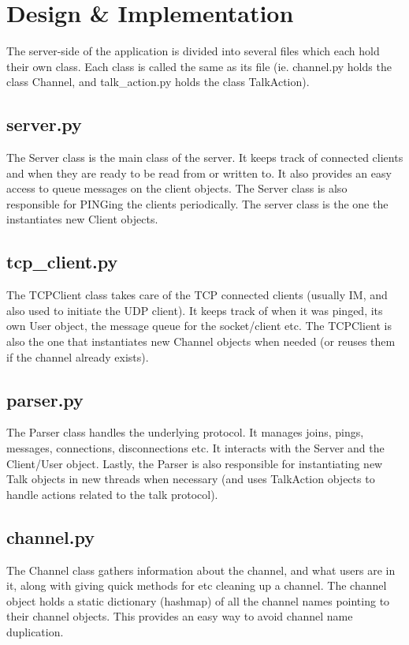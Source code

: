 \documentclass[12pt]{rapport}
\begin{document}
\section*{Design \& Implementation}
The server-side of the application is divided into several files which
each hold their own class. Each class is called the same as its file
(ie. channel.py holds the class Channel, and talk\_action.py holds the
class TalkAction).

\subsection*{server.py}
The Server class is the main class of the server. It keeps track of
connected clients and when they are ready to be read from or written
to. It also provides an easy access to queue messages on the client
objects. The Server class is also responsible for PINGing the clients
periodically. The server class is the one the instantiates new Client
objects.

\subsection*{tcp\_client.py}
The TCPClient class takes care of the TCP connected clients (usually
IM, and also used to initiate the UDP client). It keeps track of when
it was pinged, its own User object, the message queue for the
socket/client etc. The TCPClient is also the one that instantiates new
Channel objects when needed (or reuses them if the channel already
exists).

\subsection*{parser.py}
The Parser class handles the underlying protocol. It manages joins,
pings, messages, connections, disconnections etc. It interacts with
the Server and the Client/User object. Lastly, the Parser is also
responsible for instantiating new Talk objects in new threads when
necessary (and uses TalkAction objects to handle actions related to
the talk protocol).

\subsection*{channel.py}
The Channel class gathers information about the channel, and what
users are in it, along with giving quick methods for etc cleaning up a
channel. The channel object holds a static dictionary (hashmap) of all
the channel names pointing to their channel objects. This provides an
easy way to avoid channel name duplication.
\end{document}
